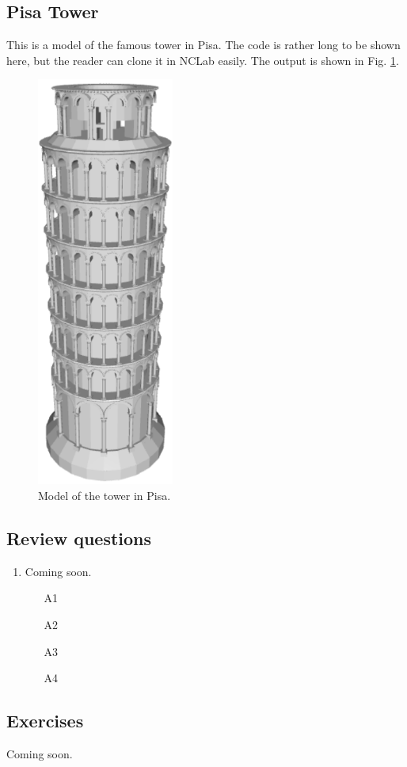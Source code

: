 \documentclass{article}
\begin{document}
\subsection{Pisa Tower}

This is a model of the famous tower in Pisa. The code is rather long to be shown
here, but the reader can clone it in NCLab easily.
The output is shown in Fig. \ref{fig:pisa-0}.

\begin{figure}[!ht]
\begin{center}
\includegraphics[width=0.4\textwidth]{img/pisa-0.png}
\end{center}
\vspace{-2mm}
\caption{Model of the tower in Pisa.}
\label{fig:pisa-0}
\end{figure}

\subsection{Review questions}

\begin{enumerate}
\item Coming soon.
\begin{itemize}
\item[A1]
\item[A2]
\item[A3]
\item[A4]
\end{itemize}
\end{enumerate}

\subsection{Exercises}

Coming soon.
\end{document}
